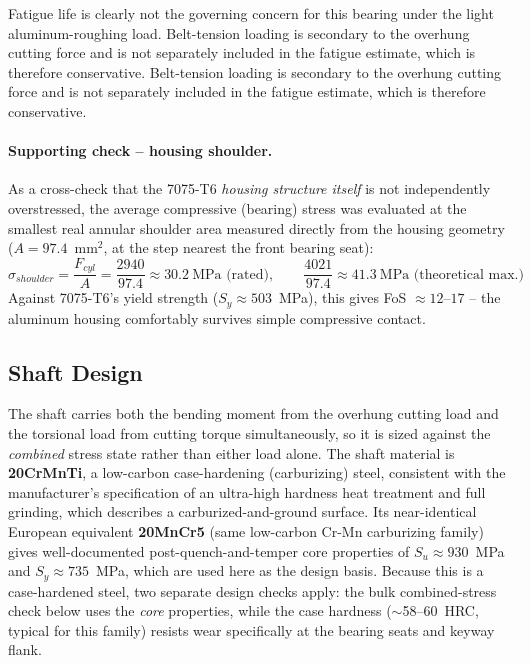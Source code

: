 \documentclass[12pt,a4paper]{report}
\begin{document}
Fatigue life is clearly not the
	governing concern for this bearing under the light aluminum-roughing load. Belt-tension loading is secondary to the overhung cutting force and is not separately included in the fatigue estimate, which is therefore conservative. Belt-tension loading is secondary to the overhung cutting force and is not separately included in the fatigue estimate, which is therefore conservative.
	
	\paragraph{Supporting check -- housing shoulder.} As a cross-check that the
	7075-T6 \emph{housing structure itself} is not independently overstressed, the average
	compressive (bearing) stress was evaluated at the smallest real annular shoulder area
	measured directly from the housing geometry ($A = 97.4$~mm$^2$, at the step nearest the front
	bearing seat):
	\begin{equation}
		\sigma_{shoulder} = \frac{F_{cyl}}{A} = \frac{2940}{97.4} \approx 30.2~\text{MPa (rated)}, \qquad
		\frac{4021}{97.4} \approx 41.3~\text{MPa (theoretical max.)}
	\end{equation}
	Against 7075-T6's yield strength ($S_y\approx503$~MPa), this gives FoS $\approx 12$--$17$ --
	the aluminum housing comfortably survives simple compressive contact.
	
	\subsection{Shaft Design}\label{sec:shaft_design}
	The shaft carries both the bending moment from the overhung cutting load and the torsional
	load from cutting torque simultaneously, so it is sized against the \emph{combined} stress
	state rather than either load alone. The shaft material is \textbf{20CrMnTi}, a
	low-carbon case-hardening (carburizing) steel, consistent with the manufacturer's
	specification of an ultra-high hardness heat treatment and full grinding, which describes a
	carburized-and-ground surface. Its near-identical European equivalent \textbf{20MnCr5} (same
	low-carbon Cr-Mn carburizing family) gives well-documented post-quench-and-temper core
	properties of $S_u \approx 930$~MPa and $S_y \approx 735$~MPa, which are used here as the
	design basis. Because this is a case-hardened steel, two separate design checks apply: the
	bulk combined-stress check below uses the \emph{core} properties, while the case hardness
	($\sim$58--60~HRC, typical for this family) resists wear specifically at the bearing seats
	and keyway flank.
	
\end{document}
